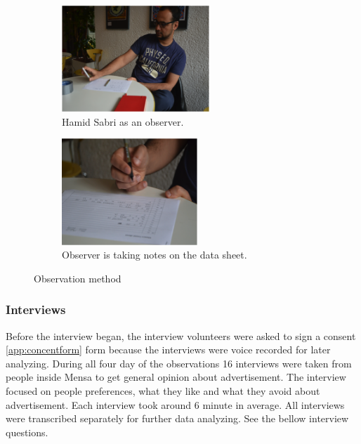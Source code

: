\begin{figure}[H]
    \centering
    \begin{subfigure}[H]{0.45\textwidth}
        \centering
        \includegraphics[width=\textwidth,height=4cm]{Figures/3/hamid}
        \caption{Hamid Sabri as an observer.}
        \label{fig:hamid}
    \end{subfigure}
    \begin{subfigure}[H]{0.45\textwidth}
        \centering
        \includegraphics[width=\textwidth,height=4cm]{Figures/3/observer}
        \caption{Observer is taking notes on the data sheet.}
        \label{fig:Observer}
    \end{subfigure}
    \caption{Observation method}
    \label{fig:observation_env}
\end{figure}


\subsubsection{Interviews}
Before the interview began, the interview volunteers were asked to sign a consent \ref{app:concentform} form because the interviews were voice recorded for later analyzing.
During all four day of the observations 16 interviews were taken from people inside Mensa to get general opinion about advertisement. The interview focused on people preferences, what they like and what they avoid about advertisement. Each interview took around 6 minute in average. All interviews were transcribed separately for further data analyzing. See the bellow interview questions. 

